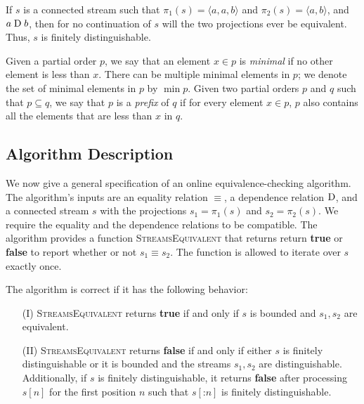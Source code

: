 \begin{example}
  If $s$ is a connected stream such that $\pi_1(s)=\langle a, a, b\rangle$
  and $\pi_2(s)=\langle a, b\rangle$, and $a \mathrel{\mathrm{D}} b$, then for no continuation
  of $s$ will the two projections ever be equivalent. Thus, $s$ is finitely
  distinguishable.
\end{example}

Given a partial
order $p$, we say that an element $x\in p$ is \emph{minimal} if no other
element is less than $x$. There can be multiple minimal elements in $p$;
we denote the set of minimal elements in $p$ by $\min p$. Given two
partial orders $p$ and $q$ such that $p\subseteq q$, we say that $p$ is
a \emph{prefix} of $q$ if for every element $x\in p$, $p$ also contains all
the elements that are less than $x$ in $q$.

\subsection{Algorithm Description}

We now give a general specification of an online equivalence-checking
algorithm.
The algorithm's inputs are an equality relation
$\equiv$, a dependence
relation $\mathrel{\mathrm{D}}$, and a connected stream $s$ with the projections $s_1=\pi_1(s)$
and $s_2=\pi_2(s)$. We require the equality and
the dependence relations to be compatible. The algorithm provides a
function \textsc{StreamsEquivalent} that returns return \textbf{true} or \textbf{false} to report whether or not $s_1 \equiv s_2$. The function
is allowed to iterate over $s$ exactly once.

The algorithm is correct if it has the following behavior:
\begin{enumerate}
  \item[(I)] \textsc{StreamsEquivalent} returns \textbf{true} if and only
    if $s$ is bounded and $s_1,s_2$ are equivalent.
  \item[(II)] \textsc{StreamsEquivalent} returns \textbf{false} if and only
    if either $s$ is finitely distinguishable or it is
    bounded and the streams $s_1,s_2$ are distinguishable.
    Additionally, if $s$ is finitely distinguishable, it returns \textbf{false} after processing $s[n]$ for the first position
    $n$ such that $s[\mathbin{:} n]$ is finitely distinguishable.
\end{enumerate}

